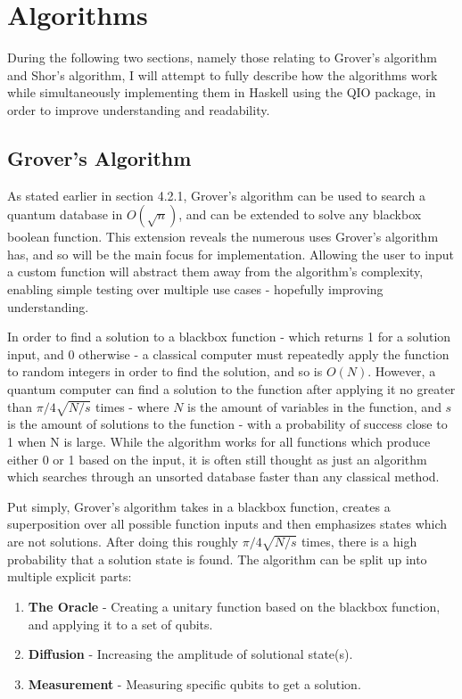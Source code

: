 \documentclass[a4paper,10pt, titlepage, twoside]{article}
\begin{document}
\section{Algorithms}
During the following two sections, namely those relating to Grover's algorithm and Shor's algorithm, I will attempt to fully describe how the algorithms work while simultaneously implementing them in Haskell using the QIO package, in order to improve understanding and readability.

\subsection{Grover's Algorithm}
As stated earlier in section 4.2.1, Grover's algorithm can be used to search a quantum database in $O(\sqrt n)$, and can be extended to solve any blackbox boolean function. This extension reveals the numerous uses Grover's algorithm has, and so will be the main focus for implementation. Allowing the user to input a custom function will abstract them away from the algorithm's complexity, enabling simple testing over multiple use cases - hopefully improving understanding.\par
In order to find a solution to a blackbox function - which returns 1 for a solution input, and 0 otherwise - a classical computer must repeatedly apply the function to random integers in order to find the solution, and so is $O(N)$. However, a quantum computer can find a solution to the function after applying it no greater than $\pi/4\sqrt{N/s}$ times - where $N$ is the amount of variables in the function, and $s$ is the amount of solutions to the function - with a probability of success close to 1 when N is large. While the algorithm works for all functions which produce either 0 or 1 based on the input, it is often still thought as just an algorithm which searches through an unsorted database faster than any classical method.\par
Put simply, Grover's algorithm takes in a blackbox function, creates a superposition over all possible function inputs and then emphasizes states which are not solutions. After doing this roughly $\pi/4\sqrt{N/s}$ times, there is a high probability that a solution state is found. The algorithm can be split up into multiple explicit parts:
\begin{enumerate}
	\item \textbf{The Oracle} -  Creating a unitary function based on the blackbox function, and applying it to a set of qubits.
	\item \textbf{Diffusion} - Increasing the amplitude of solutional state(s).
	\item \textbf{Measurement} - Measuring specific qubits to get a solution.
\end{enumerate}
\par
\end{document}
